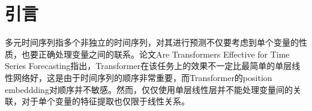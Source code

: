 \documentclass{article}
\begin{document}



\printAffiliationsAndNotice{}  %


\section{引言}
多元时间序列指多个非独立的时间序列，对其进行预测不仅要考虑到单个变量的性质，也要正确处理变量之间的联系。论文Are Transformers Effective for Time Series Forecasting指出，Transformer在该任务上的效果不一定比最简单的单层线性网络好，这是由于时间序列的顺序非常重要，而Transformer的position embeddding对顺序并不敏感。然而，仅仅使用单层线性层并不能处理变量间的关联，对于单个变量的特征提取也仅限于线性关系。
\end{document}
